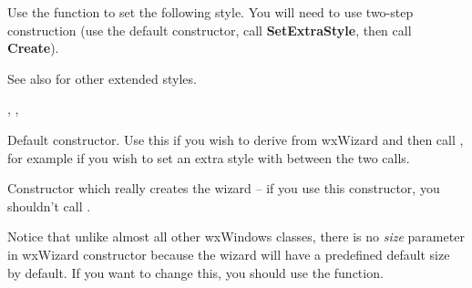 
Use the  function to set the following
style. You will need to use two-step construction (use the default constructor, call {\bf SetExtraStyle}, then call {\bf Create}).

\twocolwidtha{5cm}%
\begin{twocollist}\itemsep=0pt
\end{twocollist}

See also  for other extended styles.


, , 


\label{wxwizardctor}


Default constructor. Use this if you wish to derive from wxWizard and then call 
, for example if you wish to set an extra style
with  between the two
calls.


Constructor which really creates the wizard -- if you use this constructor, you
shouldn't call .

Notice that unlike almost all other wxWindows classes, there is no {\it size} 
parameter in wxWizard constructor because the wizard will have a predefined
default size by default. If you want to change this, you should use the 
 function.





